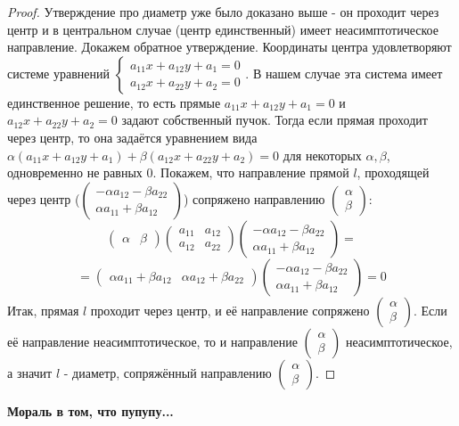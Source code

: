 \documentclass[a4paper, 12pt]{article}
\theoremstyle{definition}
\begin{document}
	\begin{proof}
		Утверждение про диаметр уже было доказано выше - он проходит через центр и в центральном случае (центр единственный) имеет неасимптотическое направление.
		Докажем обратное утверждение. Координаты центра удовлетворяют системе уравнений $\begin{cases}
			a_{11}x+a_{12}y+a_1=0\\
			a_{12}x+a_{22}y+a_2=0
		\end{cases}$. В нашем случае эта система имеет единственное решение, то есть прямые $a_{11}x+a_{12}y+a_1=0$ и $a_{12}x+a_{22}y+a_2=0$ задают собственный пучок. Тогда если прямая проходит через центр, то она задаётся уравнением вида $\alpha(a_{11}x+a_{12}y+a_1) + \beta(a_{12}x+a_{22}y+a_2) = 0$ для некоторых $\alpha, \beta$, одновременно не равных 0. Покажем, что направление прямой $l$, проходящей через центр ($\begin{pmatrix} -\alpha a_{12} - \beta a_{22} \\ \alpha a_{11} + \beta a_{12} \end{pmatrix}$) сопряжено направлению $\begin{pmatrix} \alpha \\ \beta \end{pmatrix}$: $$\begin{pmatrix} \alpha & \beta \end{pmatrix}\begin{pmatrix}a_{11}&a_{12}\\a_{12}&a_{22}\end{pmatrix}\begin{pmatrix} -\alpha a_{12} - \beta a_{22} \\ \alpha a_{11} + \beta a_{12} \end{pmatrix} = $$ $$=\begin{pmatrix} \alpha a_{11} + \beta a_{12} & \alpha a_{12} + \beta a_{22} \end{pmatrix}\begin{pmatrix} -\alpha a_{12} - \beta a_{22} \\ \alpha a_{11} + \beta a_{12} \end{pmatrix} = 0 $$
		Итак, прямая $l$ проходит через центр, и её направление сопряжено $\begin{pmatrix} \alpha \\ \beta \end{pmatrix}$. Если её направление неасимптотическое, то и направление $\begin{pmatrix} \alpha \\ \beta \end{pmatrix}$ неасимптотическое, а значит $l$ - диаметр, сопряжённый направлению $\begin{pmatrix} \alpha \\ \beta \end{pmatrix}$.
	\end{proof}
	\bfseries Мораль в том, что пупупу...\mdseries
\end{document}
